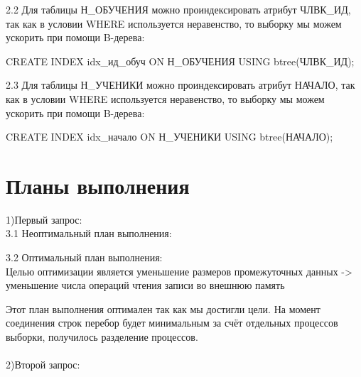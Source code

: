 \documentclass{article}
\begin{document}
2.2 Для таблицы Н\_ОБУЧЕНИЯ можно проиндексировать атрибут ЧЛВК\_ИД, так как в условии WHERE используется неравенство, то выборку мы можем ускорить при помощи B-дерева:
\begin{center}
    CREATE INDEX idx\_ид\_обуч ON Н\_ОБУЧЕНИЯ USING btree(ЧЛВК\_ИД);
\end{center}


2.3 Для таблицы Н\_УЧЕНИКИ можно проиндексировать атрибут НАЧАЛО, так как в условии WHERE используется неравенство, то выборку мы можем ускорить при помощи B-дерева:
\begin{center}
    CREATE INDEX idx\_начало ON Н\_УЧЕНИКИ USING btree(НАЧАЛО);
\end{center}

\section{Планы выполнения}
1)Первый запрос:\\



    3.1 Неоптимальный план выполнения:\\
    \begin{center}
    \end{center}
3.2 Оптимальный план выполнения: 
\\Целью оптимизации является уменьшение размеров промежуточных данных -> уменьшение числа операций чтения записи во внешнюю память
\begin{center}
\end{center}
Этот план выполнения оптимален так как мы достигли цели. На момент соединения строк перебор будет минимальным за счёт отдельных процессов выборки, получилось разделение процессов.
\\ \\
2)Второй запрос:\\
\end{document}
